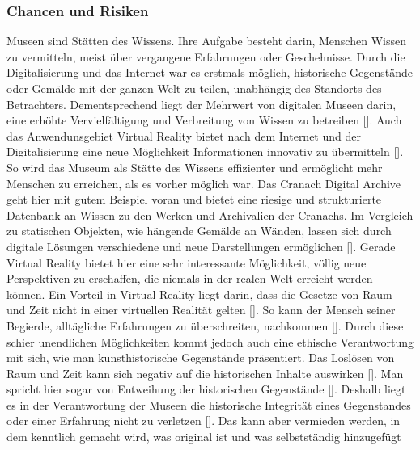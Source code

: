 \documentclass[a4paper,12pt,oneside]{article}
\begin{document}
      \subsubsection{Chancen und Risiken}
        Museen sind Stätten des Wissens. Ihre Aufgabe besteht darin, Menschen Wissen zu
        vermitteln, meist über vergangene Erfahrungen oder Geschehnisse. Durch die
        Digitalisierung und das Internet war es erstmals möglich, historische Gegenstände
        oder Gemälde mit der ganzen Welt zu teilen, unabhängig des Standorts des 
        Betrachters. Dementsprechend liegt der Mehrwert von digitalen Museen darin, eine
        erhöhte Vervielfältigung und Verbreitung von Wissen zu betreiben [\cite[17]{Huennekens2002}].
        Auch das Anwendunsgebiet Virtual Reality bietet nach dem Internet und der Digitalisierung
        eine neue Möglichkeit Informationen innovativ zu übermitteln [\cite[52]{Heidsiek2019}].
        So wird das Museum als Stätte des Wissens effizienter und ermöglicht mehr Menschen
        zu erreichen, als es vorher möglich war. Das Cranach Digital Archive geht hier mit
        gutem Beispiel voran und bietet eine riesige und strukturierte Datenbank an Wissen
        zu den Werken und Archivalien der Cranachs.
        Im Vergleich zu statischen Objekten, wie hängende Gemälde an Wänden, lassen sich 
        durch digitale Lösungen verschiedene und neue Darstellungen ermöglichen [\cite[17]{Huennekens2002}].
        Gerade Virtual Reality bietet hier eine sehr interessante Möglichkeit, völlig neue
        Perspektiven zu erschaffen, die niemals in der realen Welt erreicht werden können.
        Ein Vorteil in Virtual Reality liegt darin, dass die Gesetze von Raum und Zeit nicht
        in einer virtuellen Realität gelten [\cite[140]{Huennekens2002}]. So kann der Mensch
        seiner Begierde, alltägliche Erfahrungen zu überschreiten, nachkommen [\cite[140]{Huennekens2002}].
        Durch diese schier unendlichen Möglichkeiten kommt jedoch auch eine ethische 
        Verantwortung mit sich, wie man kunsthistorische Gegenstände präsentiert.
        Das Loslösen von Raum und Zeit kann sich negativ auf die historischen Inhalte auswirken
        [\cite[141]{Huennekens2002}]. Man spricht hier sogar von Entweihung der historischen
        Gegenstände [\cite[141]{Huennekens2002}]. Deshalb liegt es in der Verantwortung der
        Museen die historische Integrität eines Gegenstandes oder einer Erfahrung nicht
        zu verletzen [\cite[38]{Heidsiek2019}]. Das kann aber vermieden werden, in dem 
        kenntlich gemacht wird, was original ist und was selbstständig hinzugefügt
\end{document}
